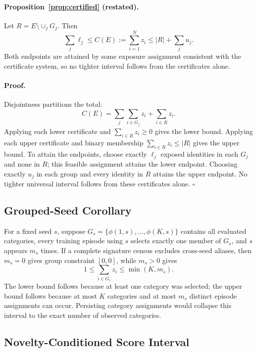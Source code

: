 \paragraph{Proposition~\ref{prop:certified} (restated).}
Let \(R=E\setminus\cup_jG_j\).  Then
\begin{equation}
\sum_j\ell_j
\leq
C(E):=\sum_{i=1}^{N}z_i
\leq
|R|+\sum_j u_j.
\label{eq:supp-certified}
\end{equation}
Both endpoints are attained by some exposure assignment consistent with the
certificate system, so no tighter interval follows from the certificates
alone.

\paragraph{Proof.}
Disjointness partitions the total:
\[
C(E)=
\sum_j\sum_{i\in G_j}z_i+\sum_{i\in R}z_i.
\]
Applying each lower certificate and
\(\sum_{i\in R}z_i\geq0\) gives the lower bound.  Applying each upper
certificate and binary membership
\(\sum_{i\in R}z_i\leq|R|\) gives the upper bound.  To attain the endpoints,
choose
exactly \(\ell_j\) exposed identities in each \(G_j\) and none in \(R\);
this feasible assignment attains the lower endpoint.  Choosing exactly
\(u_j\) in each group and every identity in \(R\) attains the upper endpoint.
No tighter universal interval follows from these certificates alone.
\(\square\)

\subsection{Grouped-Seed Corollary}

For a fixed seed \(s\), suppose
\(G_s=\{\phi(1,s),\ldots,\phi(K,s)\}\) contains all evaluated categories,
every training episode using \(s\) selects exactly one member of \(G_s\), and
\(s\) appears \(m_s\) times.  If a complete signature census excludes
cross-seed aliases, then \(m_s=0\) gives group constraint \([0,0]\), while
\(m_s>0\) gives
\begin{equation}
1\leq\sum_{i\in G_s}z_i\leq\min(K,m_s).
\end{equation}
The lower bound follows because at least one category was selected; the upper
bound follows because at most \(K\) categories and at most \(m_s\) distinct
episode assignments can occur.  Persisting category assignments would
collapse this interval to the exact number of observed categories.

\subsection{Novelty-Conditioned Score Interval}
\label{tmlrs:app:novelty-proof}

